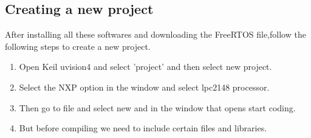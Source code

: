 \documentclass{article}
\begin{document}
\subsection{Creating a new project}
After installing all these softwares and downloading the FreeRTOS file,follow the following steps to create a new project.
\begin{enumerate}
    \item Open Keil uvision4 and select 'project' and then select new project.
    \item Select the NXP option in the window and select lpc2148 processor.
    \item Then go to file and select new and in the window that opens start coding.
    \item But before compiling we need to include certain files and libraries.


\end{enumerate}
\end{document}
